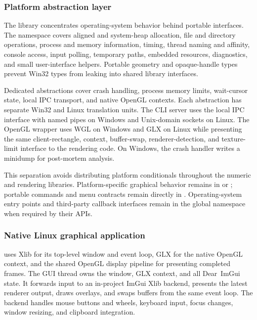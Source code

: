\subsubsection{Platform abstraction layer}
\label{subsec:platform-abstraction}

The  library concentrates operating-system behavior
behind portable interfaces. The  namespace covers aligned
and system-heap allocation, file and directory operations, process and memory
information, timing, thread naming and affinity, console access, input polling,
temporary paths, embedded resources, diagnostics, and small user-interface
helpers. Portable geometry and opaque-handle types prevent Win32 types from
leaking into shared library interfaces.

Dedicated abstractions cover crash handling, process memory limits, wait-cursor
state, local IPC transport, and native OpenGL contexts. Each abstraction has
separate Win32 and Linux translation units. The CLI server uses the local IPC
interface with named pipes on Windows and Unix-domain sockets on Linux. The
OpenGL wrapper uses WGL on Windows and GLX on Linux while presenting the same
client-rectangle, context, buffer-swap, renderer-detection, and texture-limit
interface to the rendering code. On Windows, the crash handler writes a
 minidump for post-mortem analysis.

This separation avoids distributing platform conditionals throughout the
numeric and rendering libraries. Platform-specific graphical behavior remains
in  or ; portable commands
and menu contracts remain directly in . Operating-system
entry points and third-party callback interfaces remain in the global namespace
when required by their APIs.

\subsubsection{Native Linux graphical application}
\label{subsec:linux-gui}

 uses Xlib for its top-level window and event loop,
GLX for the native OpenGL context, and the shared OpenGL display pipeline for
presenting completed frames. The GUI thread owns the window, GLX context, and
all Dear~ImGui state. It forwards input to an in-project ImGui Xlib backend,
presents the latest renderer output, draws overlays, and swaps buffers from the
same event loop. The backend handles mouse buttons and wheels, keyboard input,
focus changes, window resizing, and clipboard integration.

